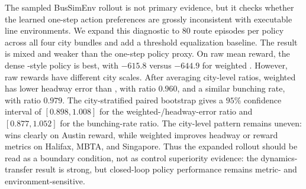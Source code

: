 The sampled BusSimEnv rollout is not primary evidence, but it checks whether the learned one-step action preferences are grossly inconsistent with executable line environments.
We expand this diagnostic to $80$ route episodes per policy across all four city bundles and add a threshold equalization baseline.
The result is mixed and weaker than the one-step policy proxy.
On raw mean reward, the dense \Htwo-style policy is best, with $-615.8$ versus $-644.9$ for weighted \ours.
However, raw rewards have different city scales.
After averaging city-level ratios, weighted \ours has lower headway error than \Htwo, with ratio $0.960$, and a similar bunching rate, with ratio $0.979$.
The city-stratified paired bootstrap gives a $95\%$ confidence interval of $[0.898,1.008]$ for the weighted-\ours/\Htwo headway-error ratio and $[0.877,1.052]$ for the bunching-rate ratio.
The city-level pattern remains uneven: \Htwo wins clearly on Austin reward, while weighted \ours improves headway or reward metrics on Halifax, MBTA, and Singapore.
Thus the expanded rollout should be read as a boundary condition, not as control superiority evidence: the dynamics-transfer result is strong, but closed-loop policy performance remains metric- and environment-sensitive.

